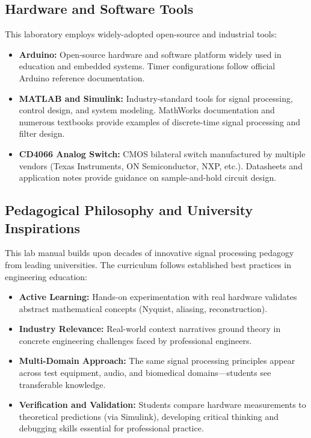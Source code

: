 \documentclass[11pt,letterpaper]{article}
\begin{document}
\subsection*{Hardware and Software Tools}

This laboratory employs widely-adopted open-source and industrial tools:

\begin{itemize}
    \item \textbf{Arduino:} Open-source hardware and software platform widely used in education and embedded systems. Timer configurations follow official Arduino reference documentation.

    \item \textbf{MATLAB and Simulink:} Industry-standard tools for signal processing, control design, and system modeling. MathWorks documentation and numerous textbooks provide examples of discrete-time signal processing and filter design.

    \item \textbf{CD4066 Analog Switch:} CMOS bilateral switch manufactured by multiple vendors (Texas Instruments, ON Semiconductor, NXP, etc.). Datasheets and application notes provide guidance on sample-and-hold circuit design.
\end{itemize}

\subsection*{Pedagogical Philosophy and University Inspirations}

This lab manual builds upon decades of innovative signal processing pedagogy from leading universities. The curriculum follows established best practices in engineering education:

\begin{itemize}
    \item \textbf{Active Learning:} Hands-on experimentation with real hardware validates abstract mathematical concepts (Nyquist, aliasing, reconstruction).

    \item \textbf{Industry Relevance:} Real-world context narratives ground theory in concrete engineering challenges faced by professional engineers.

    \item \textbf{Multi-Domain Approach:} The same signal processing principles appear across test equipment, audio, and biomedical domains—students see transferable knowledge.

    \item \textbf{Verification and Validation:} Students compare hardware measurements to theoretical predictions (via Simulink), developing critical thinking and debugging skills essential for professional practice.
\end{itemize}
\end{document}
